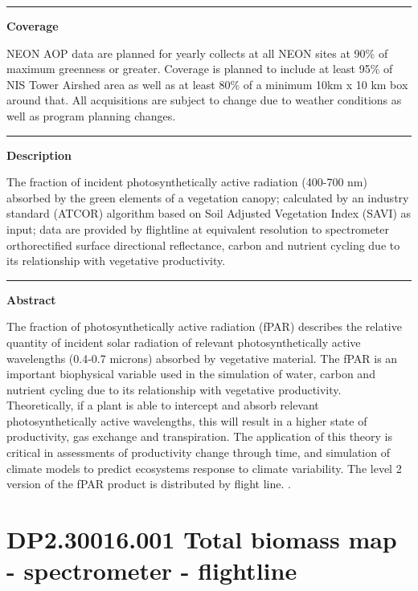 \documentclass[]{article}
\begin{document}
\begin{center}\rule{0.5\linewidth}{\linethickness}\end{center}

\textbf{Coverage}

NEON AOP data are planned for yearly collects at all NEON sites at 90\%
of maximum greenness or greater. Coverage is planned to include at least
95\% of NIS Tower Airshed area as well as at least 80\% of a minimum
10km x 10 km box around that. All acquisitions are subject to change due
to weather conditions as well as program planning changes.

\begin{center}\rule{0.5\linewidth}{\linethickness}\end{center}

\textbf{Description}

The fraction of incident photosynthetically active radiation (400-700
nm) absorbed by the green elements of a vegetation canopy; calculated by
an industry standard (ATCOR) algorithm based on Soil Adjusted Vegetation
Index (SAVI) as input; data are provided by flightline at equivalent
resolution to spectrometer orthorectified surface directional
reflectance, carbon and nutrient cycling due to its relationship with
vegetative productivity.

\begin{center}\rule{0.5\linewidth}{\linethickness}\end{center}

\textbf{Abstract}

The fraction of photosynthetically active radiation (fPAR) describes the
relative quantity of incident solar radiation of relevant
photosynthetically active wavelengths (0.4-0.7 microns) absorbed by
vegetative material. The fPAR is an important biophysical variable used
in the simulation of water, carbon and nutrient cycling due to its
relationship with vegetative productivity. Theoretically, if a plant is
able to intercept and absorb relevant photosynthetically active
wavelengths, this will result in a higher state of productivity, gas
exchange and transpiration. The application of this theory is critical
in assessments of productivity change through time, and simulation of
climate models to predict ecosystems response to climate variability.
The level 2 version of the fPAR product is distributed by flight line.
\newpage
.

\section{DP2.30016.001 Total biomass map - spectrometer -
flightline}\label{dp2.30016.001-total-biomass-map---spectrometer---flightline}
\end{document}
